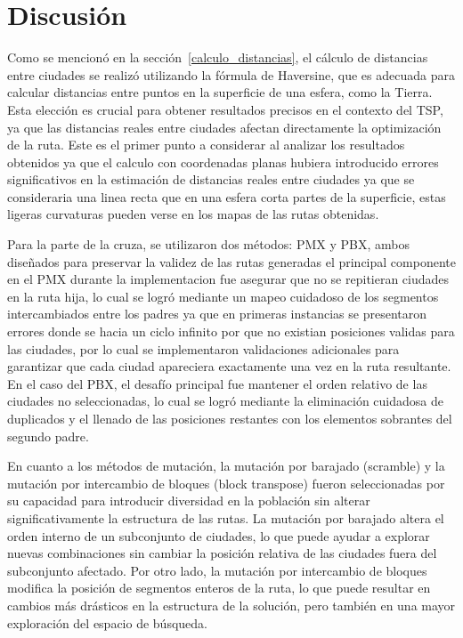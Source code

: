 \section{Discusión}

Como se mencionó en la sección~\ref{calculo_distancias}, el cálculo de distancias entre ciudades se realizó utilizando la fórmula de Haversine, que es adecuada para calcular 
distancias entre puntos en la superficie de una esfera, como la Tierra. Esta elección es crucial para obtener resultados precisos en el contexto del TSP, ya que las distancias 
reales entre ciudades afectan directamente la optimización de la ruta. Este es el primer punto a considerar al analizar los resultados obtenidos ya que el calculo con coordenadas
planas hubiera introducido errores significativos en la estimación de distancias reales entre ciudades ya que se consideraria una linea recta que en una esfera corta partes de la 
superficie, estas ligeras curvaturas pueden verse en los mapas de las rutas obtenidas.

Para la parte de la cruza, se utilizaron dos métodos: PMX y PBX, ambos diseñados para preservar la validez de las rutas generadas el principal componente en el PMX durante la
implementacion fue asegurar que no se repitieran ciudades en la ruta hija, lo cual se logró mediante un mapeo cuidadoso de los segmentos intercambiados entre los padres ya que en 
primeras instancias se presentaron errores donde se hacia un ciclo infinito por que no existian posiciones validas para las ciudades, por lo cual se implementaron validaciones 
adicionales para garantizar que cada ciudad apareciera exactamente una vez en la ruta resultante. En el caso del PBX, el desafío principal fue mantener el orden relativo de las 
ciudades no seleccionadas, lo cual se logró mediante la eliminación cuidadosa de duplicados y el llenado de las posiciones restantes con los elementos sobrantes del segundo padre.

En cuanto a los métodos de mutación, la mutación por barajado (scramble) y la mutación por intercambio de bloques (block transpose) fueron seleccionadas por su capacidad para
introducir diversidad en la población sin alterar significativamente la estructura de las rutas. La mutación por barajado altera el orden interno de un subconjunto de ciudades,
lo que puede ayudar a explorar nuevas combinaciones sin cambiar la posición relativa de las ciudades fuera del subconjunto afectado. Por otro lado, la mutación por intercambio de
bloques modifica la posición de segmentos enteros de la ruta, lo que puede resultar en cambios más drásticos en la estructura de la solución, pero también en una mayor exploración 
del espacio de búsqueda.

